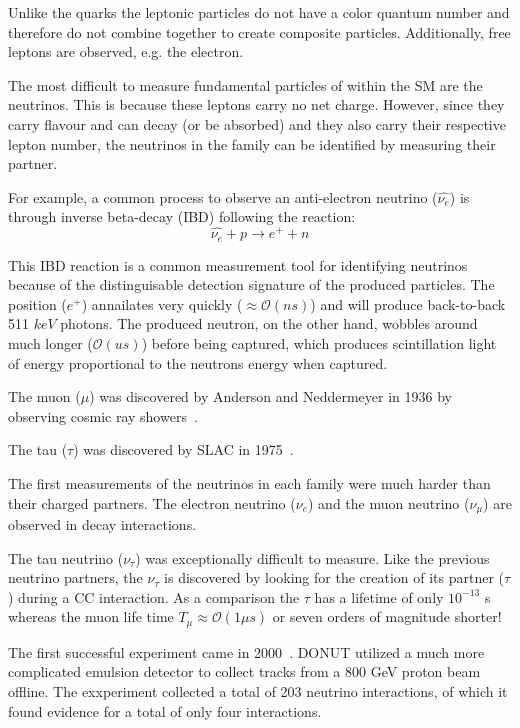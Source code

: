 Unlike the quarks the leptonic particles do not have a color quantum number and therefore do not combine together to create composite particles.
Additionally, free leptons are observed, e.g. the electron.

The most difficult to measure fundamental particles of within the SM are the neutrinos.
This is because these leptons carry no net charge.
However, since they carry flavour and can decay (or be absorbed) and they also carry their respective lepton number, the neutrinos in the family can be identified by measuring their partner.

For example, a common process to observe an anti-electron neutrino ($\hat{\nu_{e}}$) is through inverse beta-decay (IBD) following the reaction:
\begin{equation}
\hat{\nu_{e}} + p \rightarrow e^{+} + n
\end{equation}

This IBD reaction is a common measurement tool for identifying neutrinos because of the distinguisable detection signature of the produced particles.
The position ($e^{+}$) annailates very quickly ($\approx \mathcal{O}(ns)$) and will produce back-to-back 511 $keV$ photons.
The produced neutron, on the other hand, wobbles around much longer ($\mathcal{O}(us)$) before being captured, which produces scintillation light of energy proportional to the neutrons energy when captured.

The muon ($\mu$) was discovered by Anderson and Neddermeyer in 1936 by observing cosmic ray showers~\citep{muon_discovery_PhysRev.51.884}.

The tau ($\tau$) was discovered by SLAC in 1975~\citep{tau_discovery_PhysRevLett.35.1489}.

The first measurements of the neutrinos in each family were much harder than their charged partners.
The electron neutrino ($\nu_{e}$) and the muon neutrino ($\nu_{\mu}$) are observed in decay interactions.

The tau neutrino ($\nu_{\tau}$) was exceptionally difficult to measure.
Like the previous neutrino partners, the $\nu_{\tau}$ is discovered by looking for the creation of its partner ($\tau$) during a CC interaction.
As a comparison the $\tau$ has a lifetime of only $10^{-13}$ s whereas the muon life time $T_{\mu}\approx \mathcal{O}(1 \mu s)$ or seven orders of magnitude shorter!

The first successful experiment came in 2000~\citep{tau_neutrino_discovery_KODAMA2001218}.
DONUT utilized a much more complicated emulsion detector to collect tracks from a 800 GeV proton beam offline.
The exxperiment collected a total of 203 neutrino interactions, of which it found evidence for a total of only four interactions.

